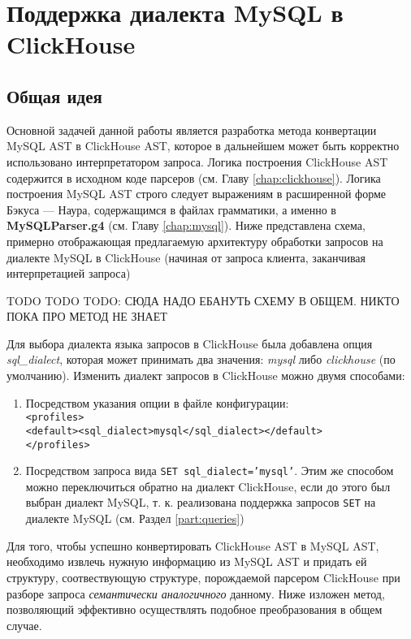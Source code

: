 \section{Поддержка диалекта MySQL в ClickHouse} \label{chap:conversion}
\subsection{Общая идея}
Основной задачей данной работы является разработка метода конвертации MySQL AST в ClickHouse AST, которое в дальнейшем может быть корректно использовано интерпретатором запроса. Логика построения ClickHouse AST содержится в исходном коде парсеров (см. Главу \ref{chap:clickhouse}).  Логика построения MySQL AST строго следует выражениям в расширенной форме Бэкуса — Наура, содержащимся в файлах грамматики, а именно в \textbf{MySQLParser.g4} (см. Главу \ref{chap:mysql}). Ниже представлена схема, примерно отображающая предлагаемую архитектуру обработки запросов на диалекте MySQL в ClickHouse (начиная от запроса клиента, заканчивая интерпретацией запроса)

TODO TODO TODO: СЮДА НАДО ЕБАНУТЬ СХЕМУ В ОБЩЕМ. НИКТО ПОКА ПРО МЕТОД НЕ ЗНАЕТ

Для выбора диалекта языка запросов в ClickHouse была добавлена опция \textit{sql\_dialect}, которая может принимать два значения: \textit{mysql} либо \textit{clickhouse} (по умолчанию). Изменить диалект запросов в ClickHouse можно двумя способами:

\begin{enumerate}
    \item Посредством указания опции в файле конфигурации:\\ \texttt{<profiles>}\\\texttt{<default><sql_dialect>mysql</sql_dialect></default>}\\ \texttt{</profiles>}
    \item Посредством запроса вида \texttt{SET sql_dialect='mysql'}. Этим же способом можно переключиться обратно на диалект ClickHouse, если до этого был выбран диалект MySQL, т. к. реализована поддержка запросов \texttt{SET} на диалекте MySQL (см. Раздел \ref{part:queries})
\end{enumerate}

Для того, чтобы успешно конвертировать ClickHouse AST в MySQL AST, необходимо извлечь нужную информацию из MySQL AST и придать ей структуру, соотвествующую структуре, порождаемой парсером ClickHouse при разборе запроса \textit{семантически аналогичного} данному. Ниже изложен метод, позволяющий эффективно осуществлять подобное преобразования в общем случае.


